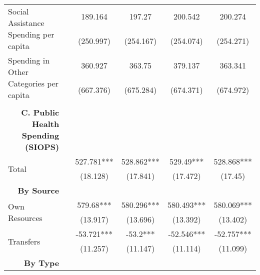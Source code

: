 \begin{table}[H]
\begin{footnotesize}
\begin{center}
{\begin{threeparttable}[b]
\begin{tabular}{rrrrrr}
    \multicolumn{1}{l}{\multirow{2}[0]{*}{Social Assistance Spending per capita}} &       & \multicolumn{1}{c}{189.164} & \multicolumn{1}{c}{197.27} & \multicolumn{1}{c}{200.542} & \multicolumn{1}{c}{200.274} \\
          &       & \multicolumn{1}{c}{(250.997)} & \multicolumn{1}{c}{(254.167)} & \multicolumn{1}{c}{(254.074)} & \multicolumn{1}{c}{(254.271)} \\
    \multicolumn{1}{l}{\multirow{2}[0]{*}{Spending in Other Categories per capita}} &       & \multicolumn{1}{c}{360.927} & \multicolumn{1}{c}{363.75} & \multicolumn{1}{c}{379.137} & \multicolumn{1}{c}{363.341} \\
          &       & \multicolumn{1}{c}{(667.376)} & \multicolumn{1}{c}{(675.284)} & \multicolumn{1}{c}{(674.371)} & \multicolumn{1}{c}{(674.972)} \\
          &       &       &       &       &  \\
    \midrule
    \multicolumn{1}{p{17.645em}}{\textbf{C. Public Health Spending (SIOPS)}} &       &       &       &       &  \\
    \multicolumn{1}{l}{\multirow{2}[0]{*}{Total}} &       & \multicolumn{1}{c}{527.781***} & \multicolumn{1}{c}{528.862***} & \multicolumn{1}{c}{529.49***} & \multicolumn{1}{c}{528.868***} \\
          &       & \multicolumn{1}{c}{(18.128)} & \multicolumn{1}{c}{(17.841)} & \multicolumn{1}{c}{(17.472)} & \multicolumn{1}{c}{(17.45)} \\
    \multicolumn{1}{p{17.645em}}{\textbf{By Source}} &       &       &       &       &  \\
    \multicolumn{1}{l}{\multirow{2}[0]{*}{Own Resources}} &       & \multicolumn{1}{c}{579.68***} & \multicolumn{1}{c}{580.296***} & \multicolumn{1}{c}{580.493***} & \multicolumn{1}{c}{580.069***} \\
          &       & \multicolumn{1}{c}{(13.917)} & \multicolumn{1}{c}{(13.696)} & \multicolumn{1}{c}{(13.392)} & \multicolumn{1}{c}{(13.402)} \\
    \multicolumn{1}{l}{\multirow{2}[0]{*}{Transfers}} &       & \multicolumn{1}{c}{-53.721***} & \multicolumn{1}{c}{-53.2***} & \multicolumn{1}{c}{-52.546***} & \multicolumn{1}{c}{-52.757***} \\
          &       & \multicolumn{1}{c}{(11.257)} & \multicolumn{1}{c}{(11.147)} & \multicolumn{1}{c}{(11.114)} & \multicolumn{1}{c}{(11.099)} \\
    \multicolumn{1}{p{17.645em}}{\textbf{By Type}} &       &       &       &       &  \\

\end{tabular}
\end{threeparttable}}
\end{center}
\end{footnotesize}
\end{table}
